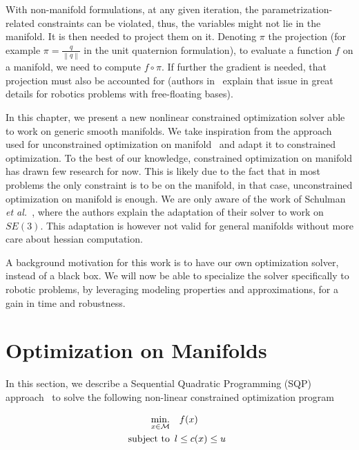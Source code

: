 With non-manifold formulations, at any given iteration, the parametrization-related constraints can be violated, thus, the variables might not lie in the manifold.
It is then needed to project them on it.
Denoting $\pi$ the projection (for example $\pi = \frac{q}{\left\|q\right\|}$ in the unit quaternion formulation), to evaluate a function $f$ on a manifold, we need to compute $f \circ \pi$.
If further the gradient is needed, that projection must also be accounted for (authors in~\cite{bouyarmane:humanoids:2012} explain that issue in great details for robotics problems with free-floating bases).

In this chapter, we present a new nonlinear constrained optimization solver able to work on generic smooth manifolds.
We take inspiration from the approach used for unconstrained optimization on manifold~\cite{absil:book:2008} and adapt it to constrained optimization.
To the best of our knowledge, constrained optimization on manifold has drawn few research for now.
This is likely due to the fact that in most problems the only constraint is to be on the manifold, in that case, unconstrained optimization on manifold is enough.
We are only aware of the work of Schulman \emph{et al.}~\cite{Schulman2014}, where the authors explain the adaptation of their solver to work on $SE(3)$.
This adaptation is however not valid for general manifolds without more care about hessian computation.

A background motivation for this work is to have our own optimization solver, instead of a black box.
We will now be able to specialize the solver specifically to robotic problems, by leveraging modeling properties and approximations, for a gain in time and robustness.

\section{Optimization on Manifolds}
\label{sec:optimization_on_manifolds}

In this section, we describe a Sequential Quadratic Programming (SQP) approach~\cite{nocedal:book:2006} to solve the following non-linear constrained optimization program

\begin{align}
\label{eq:optim_problem}
  \operatorname*{min.}_{x \in \mathcal{M}} & \quad f(x)\\
  \text{subject to}&
  \begin{array}{lr}
    l \leq c(x) \leq u \nonumber
  \end{array}
\end{align}


